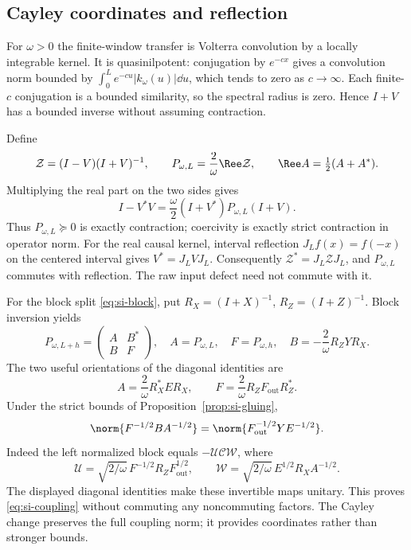 \subsection{Cayley coordinates and reflection}

For $\omega>0$ the finite-window transfer is Volterra convolution
by a locally integrable kernel. It is quasinilpotent: conjugation
by $e^{-cx}$ gives a convolution norm bounded by
$\int_0^L e^{-cu}|k_\omega(u)|\dd u$, which tends to zero as
$c\to\infty$. Each finite-$c$ conjugation is a bounded similarity,
so the spectral radius is zero. Hence $I+V$ has a bounded inverse
without assuming contraction.

Define
\begin{equation}
 \mathcal Z=(I-V)(I+V)^{-1},\qquad
 P_{\omega,L}=\frac2\omega\Ree\mathcal Z,\qquad
 \Ree A=\tfrac12(A+A^*).
\end{equation}
Multiplying the real part on the two sides gives
\begin{equation}\label{eq:si-congruence}
 I-V^*V=\frac\omega2(I+V^*)P_{\omega,L}(I+V).
\end{equation}
Thus $P_{\omega,L}\succeq0$ is exactly contraction; coercivity
is exactly strict contraction in operator norm.
For the real causal kernel, interval reflection
$J_Lf(x)=f(-x)$ on the centered interval gives
$V^*=J_LVJ_L$. Consequently $\mathcal Z^*=J_L\mathcal ZJ_L$,
and $P_{\omega,L}$ commutes with reflection. The raw input
defect need not commute with it.

For the block split \eqref{eq:si-block}, put
$R_X=(I+X)^{-1}$, $R_Z=(I+Z)^{-1}$. Block inversion yields
\begin{equation}
 P_{\omega,L+h}=\begin{pmatrix}A&B^*\\B&F\end{pmatrix},
 \quad A=P_{\omega,L},\quad F=P_{\omega,h},\quad
 B=-\frac2\omega R_ZYR_X.
\end{equation}
The two useful orientations of the diagonal identities are
\begin{equation}
 A=\frac2\omega R_X^*ER_X,\qquad
 F=\frac2\omega R_ZF_{\mathrm{out}}R_Z^*.
\end{equation}
Under the strict bounds of Proposition~\ref{prop:si-gluing},
\begin{equation}\label{eq:si-coupling}
 \norm{F^{-1/2}BA^{-1/2}}
 =\norm{F_{\mathrm{out}}^{-1/2}YE^{-1/2}}.
\end{equation}
Indeed the left normalized block equals $-\mathcal U\mathcal C\mathcal W$,
where
\[
 \mathcal U=\sqrt{2/\omega}\,F^{-1/2}R_ZF_{\mathrm{out}}^{1/2},
 \qquad
 \mathcal W=\sqrt{2/\omega}\,E^{1/2}R_XA^{-1/2}.
\]
The displayed diagonal identities make these invertible maps
unitary. This proves \eqref{eq:si-coupling} without commuting any
noncommuting factors. The Cayley change preserves the full
coupling norm; it provides coordinates rather than stronger bounds.

